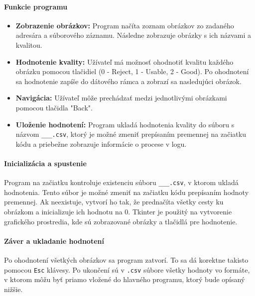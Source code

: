 \documentclass[a4paper, 11pt]{article}
\begin{document}
\paragraph{\textbf{Funkcie programu}
}

\begin{itemize}
    \item \textbf{Zobrazenie obrázkov:} Program načíta zoznam obrázkov zo zadaného adresára a súborového záznamu. Následne zobrazuje obrázky s ich názvami a kvalitou.
    
    \item \textbf{Hodnotenie kvality:} Užívateľ má možnosť ohodnotiť kvalitu každého obrázku pomocou tlačidiel (0 - Reject, 1 - Usable, 2 - Good). Po ohodnotení sa hodnotenie zapíše do dátového rámca a zobrazí sa nasledujúci obrázok.
    
    \item \textbf{Navigácia:} Užívateľ môže prechádzať medzi jednotlivými obrázkami pomocou tlačidla "Back".
    
    \item \textbf{Uloženie hodnotení:} Program ukladá hodnotenia kvality do súboru s názvom \texttt{\_\_\_.csv}, ktorý je možné zmeniť prepísaním premennej na začiatku kódu a priebežne zobrazuje informácie o procese v logu.
    
\end{itemize}

\paragraph{\textbf{Inicializácia a spustenie}
}

Program na začiatku kontroluje existenciu súboru \texttt{\_\_\_.csv}, v ktorom ukladá hodnotenia. Tento súbor je možné zmeniť na začiatku kódu prepísaním hodnoty premennej. Ak neexistuje, vytvorí ho tak, že prednačíta všetky cesty ku obrázkom a inicializuje ich hodnotu na 0. Tkinter je použitý na vytvorenie grafického prostredia, kde sú zobrazované obrázky a tlačidlá pre hodnotenie.

\paragraph{\textbf{Záver a ukladanie hodnotení}
}

Po ohodnotení všetkých obrázkov sa program zatvorí. To sa dá korektne takisto pomocou \texttt{Esc} klávesy. Po ukončení sú v \texttt{.csv} súbore všetky hodnoty vo formáte, v ktorom môžu byť priamo vložené do hlavného programu, ktorý bude opísaný nižšie.
\end{document}
